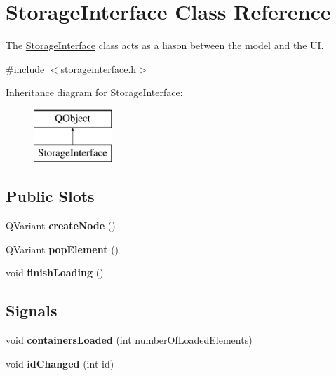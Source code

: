 \hypertarget{classStorageInterface}{}\section{Storage\+Interface Class Reference}
\label{classStorageInterface}


The \hyperlink{classStorageInterface}{Storage\+Interface} class acts as a liason between the model and the UI.  




{\ttfamily \#include $<$storageinterface.\+h$>$}

Inheritance diagram for Storage\+Interface\+:\begin{figure}[H]
\begin{center}
\leavevmode
\includegraphics[height=2.000000cm]{classStorageInterface}
\end{center}
\end{figure}
\subsection*{Public Slots}
\begin{DoxyCompactItemize}
\item 
\mbox{\label{classStorageInterface_a92a1fdb2cb4576b31fa236f8e2020f73}} 
Q\+Variant {\bfseries create\+Node} ()
\item 
\mbox{\label{classStorageInterface_a48970a8eb1a4ddba216df0f628f48347}} 
Q\+Variant {\bfseries pop\+Element} ()
\item 
\mbox{\label{classStorageInterface_aaa04b04a58411bbb50cff07b6d4b2d21}} 
void {\bfseries finish\+Loading} ()
\end{DoxyCompactItemize}
\subsection*{Signals}
\begin{DoxyCompactItemize}
\item 
\mbox{\label{classStorageInterface_adab2ae35804274ef3773e27757081ffa}} 
void {\bfseries containers\+Loaded} (int number\+Of\+Loaded\+Elements)
\item 
\mbox{\label{classStorageInterface_a34510ab0d18c65460d2f48de9899627a}} 
void {\bfseries id\+Changed} (int id)
\end{DoxyCompactItemize}
